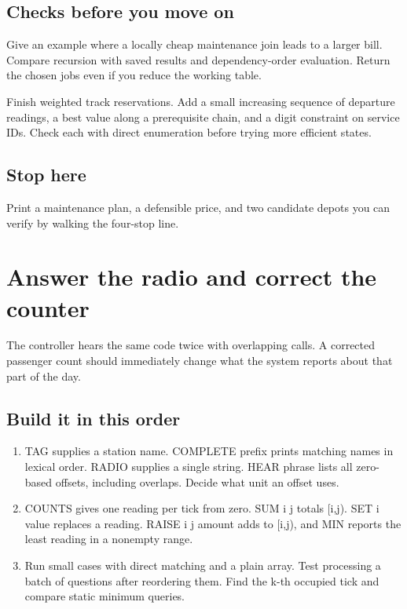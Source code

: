 \documentclass[11pt,letterpaper]{article}
\begin{document}
\subsection*{Checks before you move on}

Give an example where a locally cheap maintenance join leads to a larger bill. Compare recursion with saved results and dependency-order evaluation. Return the chosen jobs even if you reduce the working table.

Finish weighted track reservations. Add a small increasing sequence of departure readings, a best value along a prerequisite chain, and a digit constraint on service IDs. Check each with direct enumeration before trying more efficient states.

\subsection*{Stop here}

Print a maintenance plan, a defensible price, and two candidate depots you can verify by walking the four-stop line.

\clearpage

\section{Answer the radio and correct the counter}\label{trains:07}

The controller hears the same code twice with overlapping calls. A corrected passenger count should immediately change what the system reports about that part of the day.

\subsection*{Build it in this order}

\begin{enumerate}
\item TAG supplies a station name. COMPLETE prefix prints matching names in lexical order. RADIO supplies a single string. HEAR phrase lists all zero-based offsets, including overlaps. Decide what unit an offset uses.
\item COUNTS gives one reading per tick from zero. SUM i j totals [i,j). SET i value replaces a reading. RAISE i j amount adds to [i,j), and MIN reports the least reading in a nonempty range.
\item Run small cases with direct matching and a plain array. Test processing a batch of questions after reordering them. Find the k-th occupied tick and compare static minimum queries.
\end{enumerate}
\end{document}
